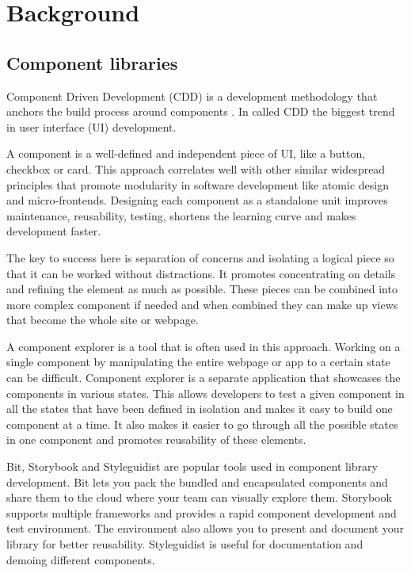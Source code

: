 \documentclass{master_thesis}
\begin{document}
\section{Background}



\subsection{Component libraries}

Component Driven Development (CDD) is a development methodology that anchors the build process around components \citep{Coleman2017}. In \citeyear{Coleman2017} \citeauthor{Coleman2017} called CDD the biggest trend in user interface (UI) development.

A component is a well-defined and independent piece of UI, like a button, checkbox or card. This approach correlates well with other similar widespread principles that promote modularity in software development like atomic design and micro-frontends. Designing each component as a standalone unit improves maintenance, reusability, testing, shortens the learning curve and makes development faster.\citep{Ella2019}

The key to success here is separation of concerns and isolating a logical piece so that it can be worked without distractions. It promotes concentrating on details and refining the element as much as possible. These pieces can be combined into more complex component if needed and when combined they can make up views that become the whole site or webpage.

A component explorer is a tool that is often used in this approach. Working on a single component by manipulating the entire webpage or app to a certain state can be difficult. Component explorer is a separate application that showcases the components in various states. This allows developers to test a given component in all the states that have been defined in isolation and makes it easy to build one component at a time. It also makes it easier to go through all the possible states in one component and promotes reusability of these elements. \citep{Coleman2017}

Bit, Storybook and Styleguidist are popular tools used in component library development. Bit lets you pack the bundled and encapsulated components and share them to the cloud where your team can visually explore them. Storybook supports multiple frameworks and provides a rapid component development and test environment. The environment also allows you to present and document your library for better reusability. Styleguidist is useful for documentation and demoing different components. \citep{Ella2019}
\end{document}
